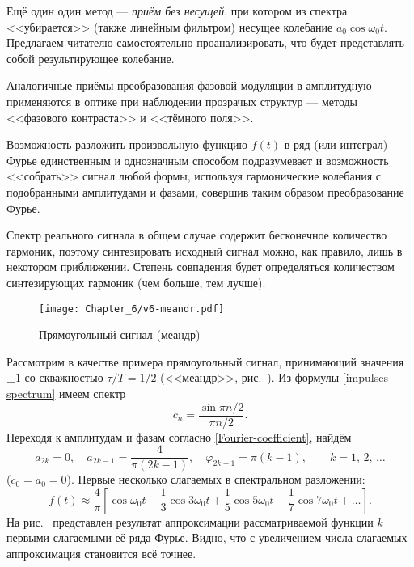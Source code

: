 Ещё один один метод --- \emph{приём без несущей}, при котором из
спектра <<убирается>> (также линейным фильтром)
несущее колебание $a_0\cos\omega_0t$. Предлагаем читателю самостоятельно
проанализировать, что будет представлять собой результирующее колебание.

Аналогичные приёмы преобразования фазовой модуляции в амплитудную
применяются в оптике при наблюдении прозрачых структур ---
методы <<фазового контраста>> и <<тёмного поля>>.


\label{sec:synth}

Возможность разложить произвольную функцию $f(t)$ в ряд (или интеграл)
Фурье единственным и однозначным способом подразумевает и возможность
<<собрать>> сигнал любой формы, используя гармонические колебания с подобранными
амплитудами и фазами, совершив таким образом  преобразование Фурье.

Спектр реального сигнала в общем случае содержит бесконечное количество
гармоник, поэтому синтезировать исходный сигнал можно, как правило,
лишь в некотором приближении. Степень совпадения будет определяться
количеством синтезирующих гармоник (чем больше, тем лучше).

\begin{figure}[h!]
 \centering\texttt{[image: Chapter\_6/v6-meandr.pdf]}
 \caption{Прямоугольный сигнал (меандр)}
\end{figure}

Рассмотрим в качестве примера прямоугольный сигнал, принимающий
значения $\pm 1$ со скважностью $\tau/T=1/2$ (<<меандр>>,
рис.~). Из формулы \eqref{impulses-spectrum} имеем спектр
\begin{equation*}
c_n = \frac{\sin \pi n/2}{\pi n/2}.
\end{equation*}
Переходя к амплитудам и фазам согласно \eqref{Fourier-coefficient},
найдём
\begin{equation*}
a_{2k}=0,\quad a_{2k-1} = \frac{4}{\pi (2k-1)},\quad
\varphi_{2k-1} = \pi (k-1),\qquad k=1,\,2,\,\ldots
\end{equation*}
($c_0=a_0=0$). Первые несколько слагаемых в спектральном разложении:
\begin{equation*}
f(t) \approx \frac{4}{\pi} \left[ \cos \omega_0 t -
\frac{1}{3}\cos 3\omega_0 t +
\frac{1}{5}\cos 5\omega_0 t -
\frac{1}{7}\cos 7\omega_0 t + \ldots\right].
\end{equation*}
На рис.~ представлен результат аппроксимации
рассматриваемой функции $k$ первыми слагаемыми её ряда Фурье.
Видно, что с увеличением числа слагаемых аппроксимация становится всё точнее.

